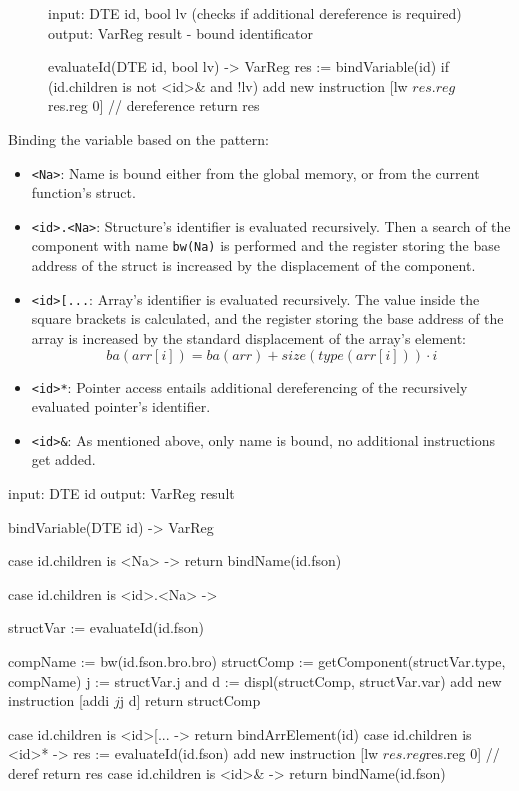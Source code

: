 \begin{figure}[h]
\centering
\begin{codeblock}[evaluateId]
input: DTE id, bool lv (checks if additional dereference is required)
output: VarReg result - bound identificator

evaluateId(DTE id, bool lv) -> VarReg {
    res := bindVariable(id)
    if (id.children is not <id>& and !lv) {
        add new instruction [lw $res.reg $res.reg 0] // dereference
    }
    return res
}
\end{codeblock}
\label{fig:evalId}
\end{figure}

\newpage
Binding the variable based on the pattern:
\begin{itemize}
\item \verb+<Na>+: Name is bound either from the global memory, or from the current function's struct.
\item \verb+<id>.<Na>+: Structure's identifier is evaluated recursively. Then a search of the component
with name \verb+bw(Na)+ is performed and the register storing the base address of the struct is increased by
the displacement of the component.
\item \verb+<id>[...+: Array's identifier is evaluated recursively. The value inside the square brackets is calculated,
and the register storing the base address of the array is increased by the standard displacement of the array's element:
\[ba(arr[i]) = ba(arr) + size(type(arr[i])) \cdot i\]
\item \verb+<id>*+: Pointer access entails additional dereferencing of the recursively evaluated pointer's identifier.
\item \verb+<id>&+: As mentioned above, only name is bound, no additional instructions get added.
\end{itemize}

\begin{codeblock}[bindVariable]
input: DTE id
output: VarReg result

bindVariable(DTE id) -> VarReg {
    case id.children is <Na> -> {
        return bindName(id.fson)
    }

    case id.children is <id>.<Na> -> {
        structVar := evaluateId(id.fson)

        compName := bw(id.fson.bro.bro)
        structComp := getComponent(structVar.type, compName)
        j := structVar.j and d := displ(structComp, structVar.var)
        add new instruction [addi $j $j d]
        return structComp
    }

    case id.children is <id>[... -> return bindArrElement(id)
    case id.children is <id>* -> {
        res := evaluateId(id.fson)
        add new instruction [lw $res.reg $res.reg 0] // deref
        return res
    }
    case id.children is <id>& -> {
        return bindName(id.fson)
    }
}
\end{codeblock}

